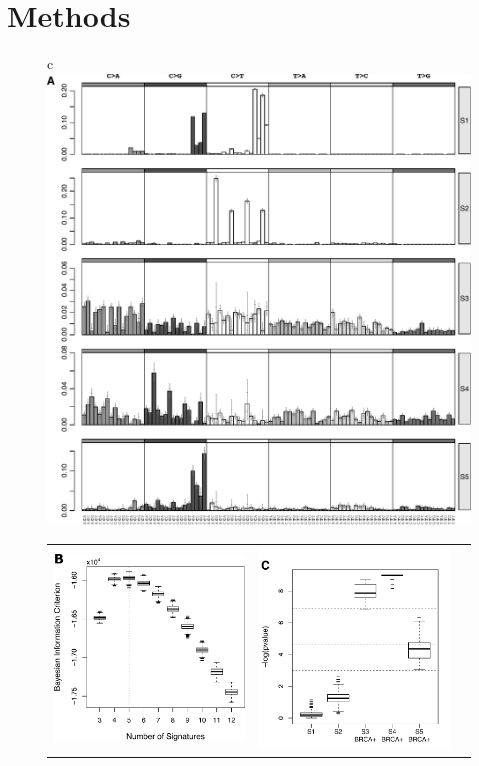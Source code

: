 \documentclass{bioinfo}
\begin{document}
\section{Methods}
\begin{figure}[htb!]
 \centering
 \begin{tabular}{c}
  \includegraphics[width=14cm]{figs/Signatures_5_com_Opp_bw}
  \\
  \begin{tabular}{ccc}
   \includegraphics[width=5.5cm]{figs/BICs_21bc_with_Opportunity_5_3to12}
   &
   \includegraphics[width=5.5cm]{figs/Diffexp_boxplot_21bc_com_Opp_bw3}

\end{tabular}
\end{tabular}
\end{figure}
\end{document}
